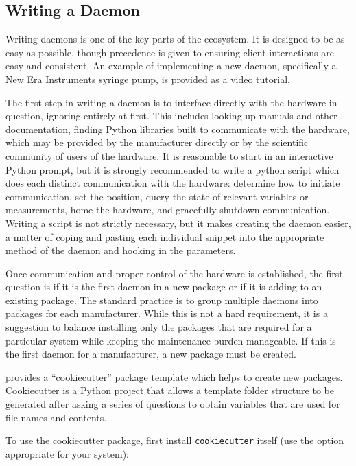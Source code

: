 \subsection{Writing a Daemon}

Writing daemons is one of the key parts of the \yaq{} ecosystem.
It is designed to be as easy as possible, though precedence is given to ensuring client interactions are easy and consistent.
An example of implementing a new daemon, specifically a New Era Instruments syringe pump, is provided as a video tutorial\cite{}.


The first step in writing a daemon is to interface directly with the hardware in question, ignoring \yaq{} entirely at first.
This includes looking up manuals and other documentation, finding Python libraries built to communicate with the hardware, which may be provided by the manufacturer directly or by the scientific community of users of the hardware.
It is reasonable to start in an interactive Python prompt, but it is strongly recommended to write a python script which does each distinct communication with the hardware: determine how to initiate communication, set the position, query the state of relevant variables or measurements, home the hardware, and gracefully shutdown communication.
Writing a script is not strictly necessary, but it makes creating the daemon easier, a matter of coping and pasting each individual snippet into the appropriate method of the daemon and hooking in the parameters.

Once communication and proper control of the hardware is established, the first question is if it is the first daemon in a new package or if it is adding to an existing package.
The standard practice is to group multiple daemons into packages for each manufacturer.
While this is not a hard requirement, it is a suggestion to balance installing only the packages that are required for a particular system while keeping the maintenance burden manageable.
If this is the first daemon for a manufacturer, a new package must be created.

\yaq{} provides a ``cookiecutter'' package template which helps to create new \yaq{} packages\cite{}.
Cookiecutter is a Python project that allows a template folder structure to be generated after asking a series of questions to obtain variables that are used for file names and contents\cite{}.

To use the \yaq{} cookiecutter package, first install \texttt{cookiecutter} itself (use the option appropriate for your system):

